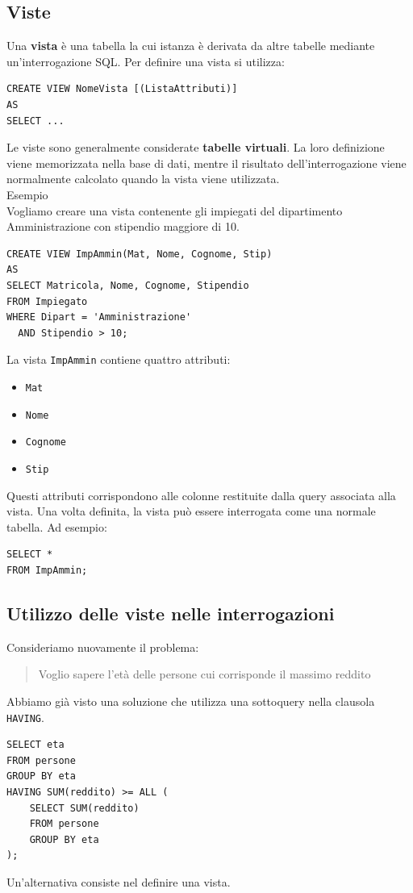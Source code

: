 \subsection{Viste}
Una \textbf{vista} è una tabella la cui istanza
è derivata da altre tabelle mediante
un'interrogazione SQL.
Per definire una vista si utilizza:
\begin{verbatim}
CREATE VIEW NomeVista [(ListaAttributi)]
AS
SELECT ...
\end{verbatim}
Le viste sono generalmente considerate
\textbf{tabelle virtuali}.
La loro definizione viene memorizzata nella base
di dati, mentre il risultato dell'interrogazione
viene normalmente calcolato quando la vista
viene utilizzata.\\
\textcolor{verdeEsempio}{Esempio}\\
Vogliamo creare una vista contenente gli impiegati
del dipartimento Amministrazione con stipendio
maggiore di 10.
\begin{verbatim}
CREATE VIEW ImpAmmin(Mat, Nome, Cognome, Stip)
AS
SELECT Matricola, Nome, Cognome, Stipendio
FROM Impiegato
WHERE Dipart = 'Amministrazione'
  AND Stipendio > 10;
\end{verbatim}
La vista \texttt{ImpAmmin} contiene quattro attributi:
\begin{itemize}
    \item \texttt{Mat}
    \item \texttt{Nome}
    \item \texttt{Cognome}
    \item \texttt{Stip}
\end{itemize}
Questi attributi corrispondono alle colonne
restituite dalla query associata alla vista.
Una volta definita, la vista può essere
interrogata come una normale tabella.
Ad esempio:
\begin{verbatim}
SELECT *
FROM ImpAmmin;
\end{verbatim}
\subsection{Utilizzo delle viste nelle interrogazioni}
Consideriamo nuovamente il problema:
\begin{quote}
Voglio sapere l'età delle persone cui corrisponde il massimo reddito
\end{quote}
Abbiamo già visto una soluzione che utilizza
una sottoquery nella clausola \texttt{HAVING}.
\begin{verbatim}
SELECT eta
FROM persone
GROUP BY eta
HAVING SUM(reddito) >= ALL (
    SELECT SUM(reddito)
    FROM persone
    GROUP BY eta
);
\end{verbatim}
Un'alternativa consiste nel definire una vista.
